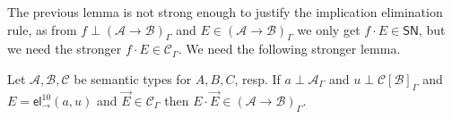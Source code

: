 \documentclass[a4paper,USenglish,cleveref, autoref, thm-restate]{lipics-v2019}
\newcommand{\tel}{\mathsf{el}}
\newcommand{\el}[2]{\tel_{#1}^{#2}}
\newcommand{\A}{\mathcal{A}}
\newcommand{\B}{\mathcal{B}}
\newcommand{\C}{\mathcal{C}}
\newcommand{\SN}{\mathsf{SN}}
\begin{document}
The previous lemma is not strong enough to justify the implication
elimination rule, as from $f \perp (\A \to \B)_\Gamma$ and $E \in (\A
\to \B)_\Gamma$ we only get $f \cdot E \in \SN$, but we need the
stronger $f \cdot E \in \C_\Gamma$.
We need the following stronger lemma.

\begin{lemma}
  \label{lem:appprev}
  Let $\A,\B,\C$ be semantic types for $A,B,C$, resp.  If
  $a \perp \A_\Gamma$ and $u \perp \C[\B]_\Gamma$ and
  $E = \el\to{10}(a,u)$ and $\vec E \in \C_\Gamma$ then
  $E \cdot \vec E \in (\A \to \B)_\Gamma$.
\end{lemma}
\end{document}
